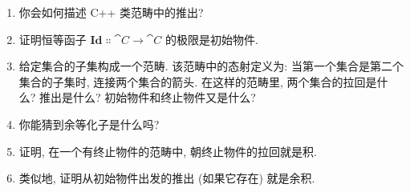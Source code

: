 \begin{enumerate}
  \tightlist
  \item
        你会如何描述 C++ 类范畴中的推出?
  \item
        证明恒等函子 $\mathbf{Id} \Colon \cat{C} \to \cat{C}$ 的极限是初始物件.
  \item
        给定集合的子集构成一个范畴. 该范畴中的态射定义为: 当第一个集合是第二个集合的子集时,
        连接两个集合的箭头. 在这样的范畴里, 两个集合的拉回是什么? 推出是什么?
        初始物件和终止物件又是什么?
  \item
        你能猜到余等化子是什么吗?
  \item
        证明, 在一个有终止物件的范畴中, 朝终止物件的拉回就是积.
  \item
        类似地, 证明从初始物件出发的推出 (如果它存在) 就是余积.
\end{enumerate}
